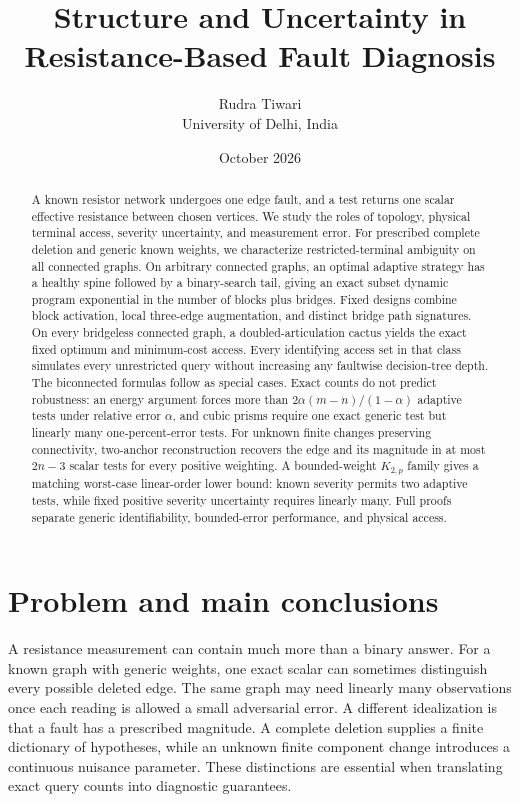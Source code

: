 \documentclass[11pt,letterpaper]{article}
\title{Structure and Uncertainty in Resistance-Based Fault Diagnosis}
\author{Rudra Tiwari\\University of Delhi, India}
\date{October 2026}
\begin{document}
\maketitle
\begin{abstract}
A known resistor network undergoes one edge fault, and a test returns one scalar effective resistance between chosen vertices. We study the roles of topology, physical terminal access, severity uncertainty, and measurement error. For prescribed complete deletion and generic known weights, we characterize restricted-terminal ambiguity on all connected graphs. On arbitrary connected graphs, an optimal adaptive strategy has a healthy spine followed by a binary-search tail, giving an exact subset dynamic program exponential in the number of blocks plus bridges. Fixed designs combine block activation, local three-edge augmentation, and distinct bridge path signatures. On every bridgeless connected graph, a doubled-articulation cactus yields the exact fixed optimum and minimum-cost access. Every identifying access set in that class simulates every unrestricted query without increasing any faultwise decision-tree depth. The biconnected formulas follow as special cases. Exact counts do not predict robustness: an energy argument forces more than $2\alpha(m-n)/(1-\alpha)$ adaptive tests under relative error $\alpha$, and cubic prisms require one exact generic test but linearly many one-percent-error tests. For unknown finite changes preserving connectivity, two-anchor reconstruction recovers the edge and its magnitude in at most $2n-3$ scalar tests for every positive weighting. A bounded-weight $K_{2,p}$ family gives a matching worst-case linear-order lower bound: known severity permits two adaptive tests, while fixed positive severity uncertainty requires linearly many. Full proofs separate generic identifiability, bounded-error performance, and physical access.
\end{abstract}


\section{Problem and main conclusions}
A resistance measurement can contain much more than a binary answer. For a known graph with generic weights, one exact scalar can sometimes distinguish every possible deleted edge. The same graph may need linearly many observations once each reading is allowed a small adversarial error. A different idealization is that a fault has a prescribed magnitude. A complete deletion supplies a finite dictionary of hypotheses, while an unknown finite component change introduces a continuous nuisance parameter. These distinctions are essential when translating exact query counts into diagnostic guarantees.
\end{document}
